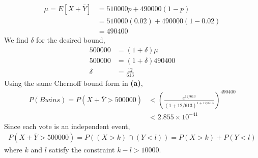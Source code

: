 \documentclass[letterpaper, 11pt]{article}
\begin{document}
\begin{align*}
\mu = E[X+\bar Y] &= 510000p + 490000(1-p) \\
&= 510000(0.02) + 490000(1-0.02) \\
&= 490400
\end{align*}
We find $\delta$ for the desired bound,
\begin{align*}
500000 &= (1+\delta)\mu \\
500000 &= (1+\delta)490400 \\
\delta &= \frac{12}{613}
\end{align*}
Using the same Chernoff bound form in \textbf{(a)},
\begin{align*}
P(Bwins) = P(X + \bar Y > 500000) &< \left(\frac{e^{12/613}}{(1+12/613)^{1+12/613}}\right)^{490400} \\
&< 2.855 \times 10^{-41}
\end{align*}
Since each vote is an independent event,
\begin{align*}
P(X + \bar Y > 500000) = P((X > k) \cap (Y < l)) = P(X > k) + P(Y < l)
\end{align*}
where $k$ and $l$ satisfy the constraint $k-l > 10000$.
\pagebreak
\end{document}
